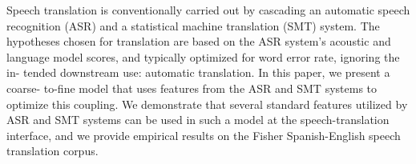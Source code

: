 Speech translation is conventionally carried out by cascading an automatic speech recognition (ASR) and a statistical machine translation (SMT) system. The hypotheses chosen for translation are based on the ASR system's acoustic and language model scores, and typically optimized for word error rate, ignoring the in- tended downstream use: automatic translation. In this paper, we present a coarse- to-fine model that uses features from the ASR and SMT systems to optimize this coupling. We demonstrate that several standard features utilized by ASR and SMT systems can be used in such a model at the speech-translation interface, and we provide empirical results on the Fisher Spanish-English speech translation corpus.
